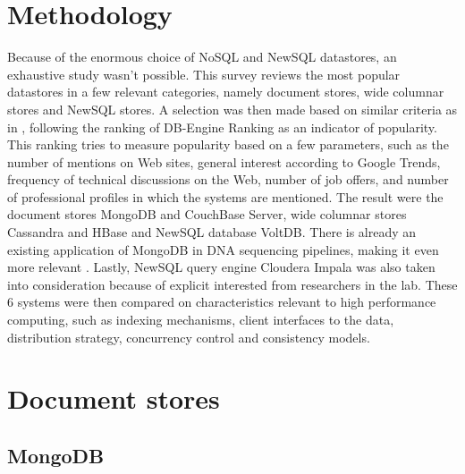 \documentclass{IEEEtran}
\begin{document}



\section{Methodology}

Because of the enormous choice of NoSQL and NewSQL datastores, an exhaustive study wasn't possible. This survey reviews the most popular datastores in a few relevant categories, namely document stores, wide columnar stores and NewSQL stores. A selection was then made based on similar criteria as in \cite{grolinger2013data}, following the ranking of DB-Engine Ranking \cite{db_engine_rank} as an indicator of popularity. This ranking tries to measure popularity based on a few parameters, such as the number of mentions on Web sites, general interest according to Google Trends, frequency of technical discussions on the Web, number of job offers, and number of professional profiles in which the systems are mentioned. The result were the document stores MongoDB and CouchBase Server, wide columnar stores Cassandra and HBase and NewSQL database VoltDB. There is already an existing application of MongoDB in DNA sequencing pipelines, making it even more relevant \cite{elprep_mongo}. Lastly, NewSQL query engine Cloudera Impala was also taken into consideration because of explicit interested from researchers in the lab. %
These 6 systems were then compared on characteristics relevant to high performance computing, such as indexing mechanisms, client interfaces to the data, distribution strategy, concurrency control and consistency models.

%
\section{Document stores}

\subsection{MongoDB}
\end{document}
